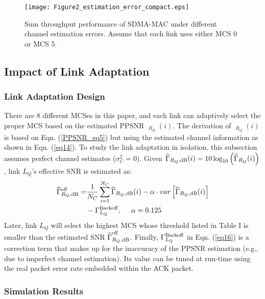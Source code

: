 \documentclass[journal, final]{IEEEtran}
\begin{document}
\begin{figure}
\centering
\texttt{[image: Figure2\_estimation\_error\_compact.eps]}
\caption{Sum throughput performance of SDMA-MAC under different channel estimation errors. Assume that each link uses either MCS 0 or MCS 5.}
\label{Fig2_estimation_error}
\end{figure}

\subsection{Impact of Link Adaptation}

\subsubsection{Link Adaptation Design}

There are 8 different MCSes in this paper, and each
link can adaptively select the proper MCS based on the estimated PPSNR $\mathop {\widehat{\Gamma }}\nolimits_{R_Q } (i)$. The derivation of $\mathop {\widehat{\Gamma }}\nolimits_{R_Q } (i)$ is based on Eqn. (\ref{PPSNR_eq5}) but using the estimated channel information as shown in Eqn. (\ref{eq14}). To
study the link adaptation in isolation, this subsection assumes perfect channel
estimates ($\sigma _C^2 = 0$). Given ${\widehat{\Gamma }}_{R_Q ,{\rm dB}} (i) = 10\log _{10} \left(
{\mathop {\widehat{\Gamma }}\nolimits_{R_Q } (i)} \right)$, link $L_Q $'s effective SNR is estimated as:
\begin{align}
\label{eq16}
 {\widehat{\Gamma }}_{R_Q,{\rm dB}}^{\rm eff} = & \frac{1}{N_C}\sum\limits_{i=1}^{N_C}{\widehat{\Gamma }}_{R_Q ,{\rm dB}} (i) - \alpha \cdot var\left[{\widehat{\Gamma }}_{R_Q ,{\rm dB}} (i)\right] \nonumber\\
 &- \Gamma _{L_Q }^{\rm Backoff},\ \ \ \ \alpha = 0.125
\end{align}
Later, link $L_Q $ will select the
highest MCS whose threshold listed in Table I is smaller than the estimated SNR $\mathop {\widehat{\Gamma }}\nolimits_{R_Q
,{\rm dB}}^{\rm eff} $. Finally, $\Gamma _{L_Q }^{\rm Backoff} $ in Eqn. (\ref{eq16}) is a correction term that makes up for
the inaccuracy of the PPSNR estimation (e.g., due to imperfect channel estimation). Its value can be
tuned at run-time using the real packet error rate embedded within the
ACK packet.



\subsubsection{Simulation Results}
\end{document}
